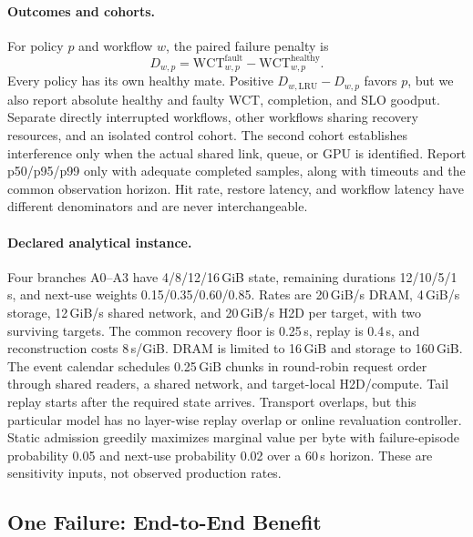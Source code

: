 \documentclass[sigplan,10pt,anonymous,nonacm]{acmart}
\begin{document}
\paragraph{Outcomes and cohorts.}
For policy $p$ and workflow $w$, the paired failure penalty is
\begin{equation}
 D_{w,p}=\mathrm{WCT}^{\mathrm{fault}}_{w,p}
          -\mathrm{WCT}^{\mathrm{healthy}}_{w,p}.
 \label{eq:eval-penalty}
\end{equation}
Every policy has its own healthy mate. Positive
$D_{w,\mathrm{LRU}}-D_{w,p}$ favors $p$, but we also report absolute healthy
and faulty WCT, completion, and SLO goodput. Separate directly interrupted
workflows, other workflows sharing recovery resources, and an isolated
control cohort. The second cohort establishes interference only when
the actual shared link, queue, or GPU is identified. Report p50/p95/p99
only with adequate completed samples, along with timeouts and the common
observation horizon. Hit rate, restore latency, and workflow latency have
different denominators and are never interchangeable.

\paragraph{Declared analytical instance.}
Four branches A0--A3 have 4/8/12/16\,GiB state, remaining durations
12/10/5/1\,s, and next-use weights 0.15/0.35/0.60/0.85. Rates are
20\,GiB/s DRAM, 4\,GiB/s storage, 12\,GiB/s shared network, and
20\,GiB/s H2D per target, with two surviving targets. The common recovery
floor is 0.25\,s, replay is 0.4\,s, and reconstruction costs 8\,s/GiB.
DRAM is limited to 16\,GiB and storage to 160\,GiB. The event calendar
schedules 0.25\,GiB chunks in round-robin request order through shared
readers, a shared network, and target-local H2D/compute. Tail replay starts
after the required state arrives. Transport overlaps, but this particular
model has no layer-wise replay overlap or online revaluation controller.
Static admission greedily maximizes marginal value per byte with
failure-episode probability 0.05 and next-use probability 0.02 over a
60\,s horizon. These are sensitivity inputs, not observed production rates.

\FloatBarrier
\subsection{One Failure: End-to-End Benefit}
\label{sec:eval-workflow}
\end{document}
